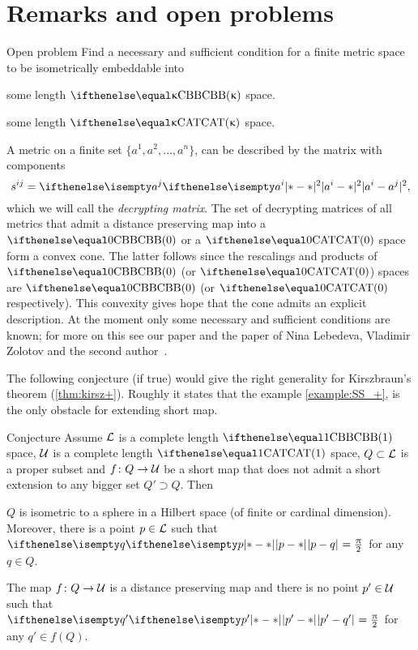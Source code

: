 \section{Remarks and open problems}\label{sec:kirszbraun:open}


\begin{thm}{Open problem}\label{open:n-point-CBB}
Find a necessary and sufficient condition for a finite metric space to be isometrically embeddable into 
\begin{subthm}{}
some length $\Alex{\kappa}$ space.
\end{subthm}
\begin{subthm}{}
some length $\CAT{\kappa}$ space.
\end{subthm}

\end{thm}

A metric on a finite set $\{a^1,a^2,\dots,a^n\}$,
can be described by the matrix with components
\[s^{ij}
=
\dist[2]{a^i}{a^j}{},\]
which we will call the  \emph{decrypting matrix}.
The set of decrypting matrices of all metrics that admit a distance preserving map into a $\Alex{0}$ or a $\CAT{0}$ space 
form a convex cone. 
The latter follows since the rescalings and products of $\Alex{0}$ (or $\CAT{0}$) spaces are  $\Alex{0}$ (or $\CAT{0}$ respectively).
This convexity gives hope that the cone admits an explicit description.
At the moment only some necessary and sufficient conditions are known;
for more on this see our paper \cite{alexander-kapovitch-kirszbraun} 
and the paper of Nina Lebedeva, Vladimir Zolotov and the second author~\cite{lebedeva-petrunin-zolotov}.

The following conjecture (if true) would give the  right generality for  Kirszbraun's theorem (\ref{thm:kirsz+}).
Roughly it states that the example \ref{example:SS_+}, 
is the only obstacle for extending short map.

\begin{thm}{Conjecture}\label{conj:kirsz}
Assume $\mathcal{L}$ is a complete length $\Alex1$ space,
$\mathcal{U}$ is a complete length $\CAT1$ space,
$Q\subset \spc{L}$ is a proper subset
and $f\: Q\to\spc{U}$ be a short map that does not admit a short extension to any bigger set $Q'\supset Q$. 
Then 

\begin{subthm}{}
$Q$ is isometric to a sphere in a Hilbert space (of finite or cardinal dimension).
Moreover, there is a point $p\in \spc{L}$ such that $\dist{p}{q}{}=\tfrac{\pi}{2}$ for any $q\in Q$.
\end{subthm}

\begin{subthm}{}
The map $f\:Q\to\spc{U}$ is a distance preserving map and there is no point $p'\in \spc{U}$ such that $\dist{p'}{q'}{}=\tfrac{\pi}{2}$ for any $q'\in f(Q)$.
\end{subthm}
\end{thm}



